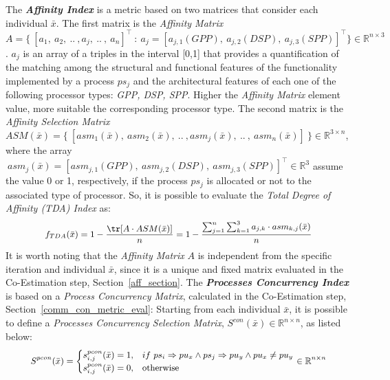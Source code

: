 The \textbf{\textit{Affinity Index}} \cite{bib27} is a metric based on two matrices that consider each individual $\bar x$. The first matrix is the \textit{Affinity Matrix} $A = \{ \ [a_{1}, \ a_{2}, \ .. \ , a_{j}, \ .. \ , \ a_{n}]^\intercal \ : \ a_{j} = [a_{j,1}(GPP), \ a_{j,2}(DSP), \ a_{j,3}(SPP)]^\intercal\} \in \mathbb{R}^{n \times 3}$. $a_{j}$ is an array of a triples in the interval [0,1] that provides a quantification of the matching among the structural and functional features of the functionality implemented by a process $ps_{j}$ and the architectural features of each one of the following processor types: \textit{GPP, DSP, SPP}. Higher the \textit{Affinity Matrix} element value, more suitable the corresponding processor type. The second matrix is the \textit{Affinity Selection Matrix} $ASM(\bar x) = \{ \ [asm_{1}(\bar x), \ asm_{2}(\bar x), \ .. \ , asm_{j}(\bar x), \ .. \ , \ asm_{n}(\bar x)] \ \} \in \mathbb{R}^{3 \times n} $, where the array $\ asm_{j}(\bar x) = [asm_{j,1}(GPP), \ asm_{j,2}(DSP), \ asm_{j,3}(SPP)]^\intercal \in \mathbb{R}^{3}$ assume the value 0 or 1, respectively, if the process $ps_{j}$ is allocated or not to the associated type of processor. So, it is possible to evaluate the \textit{Total Degree of Affinity (TDA) Index} as:
%
\begin{equation} \label{eq3}
\small
\begin{aligned}
f_{TDA}(\bar x) = 1 - \frac{\tr[A \cdot ASM(\bar x)]}{n}  
 		    = 1 - \frac{\sum^n_{j=1}\sum^3_{k=1}{a_{j,k} \cdot asm_{k,j}(\bar x)}}{n}
\end{aligned}
\end{equation}
%
It is worth noting that the \textit{Affinity Matrix} $A$ is independent from the specific iteration and individual \textit{$\bar x$}, since it is a unique and fixed matrix evaluated in the Co-Estimation step, Section~\ref{aff_section}.
%
The \textbf{\textit{Processes Concurrency Index}} \cite{bib24_b}\cite{bib24_c} is based on a \textit{Process Concurrency Matrix}, calculated in the Co-Estimation step, Section~\ref{comm_con_metric_eval}:
Starting from each individual $\bar x$, it is possible to define a \textit{Processes Concurrency Selection Matrix}, $S^{con}(\bar x) \in \mathbb{R}^{n \times n}$, as listed below:
%
\begin{equation} \label{eq5}
\small
\begin{aligned}
S^{pcon}(\bar x) = \begin{cases}
    s^{pcon}_{i,j}(\bar x) = 1, & if \ ps_{i} \Rightarrow pu_{x} \land ps_{j} \Rightarrow pu_{y} \land pu_{x} \neq pu_{y}\\
    s^{pcon}_{i,j}(\bar x) = 0, & \text{otherwise}
\end{cases} \in \mathbb{R}^{n \times n}
\end{aligned}
\end{equation}
